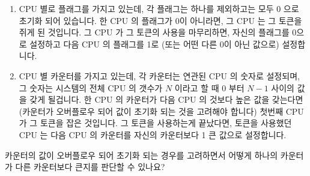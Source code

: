 \begin{enumerate}
\item	CPU 별로 플래그를 가지고 있는데, 각 플래그는 하나를 제외하고는 모두 0
	으로 초기화 되어 있습니다.
	한 CPU 의 플래그가 0이 아니라면, 그 CPU 는 그 토큰을 쥐게 된 것입니다.
	그 CPU 가 그 토큰의 사용을 마무리하면, 자신의 플래그를 0으로 설정하고
	다음 CPU 의 플래그를 1로 (또는 어떤 다른 0이 아닌 값으로) 설정합니다.
\item	CPU 별 카운터를 가지고 있는데, 각 카운터는 연관된 CPU 의 숫자로
	설정되며, 그 숫자는 시스템의 전체 CPU 의 갯수가 $N$ 이라고 할 때 0 부터
	$N-1$ 사이의 값을 갖게 될겁니다.
	한 CPU 의 카운터가 다음 CPU 의 것보다 높은 값을 갖는다면 (카운터가
	오버플로우 되어 값이 초기화 되는 것을 고려해야 합니다) 첫번째 CPU 가 그
	토큰을 잡은 것입니다.
	그 토큰을 사용하는게 끝났다면, 토큰을 사용했던 CPU 는 다음 CPU 의
	카운터를 자신의 카운터보다 1 큰 값으로 설정합니다.

\end{enumerate}

\QuickQuiz{}
	카운터의 값이 오버플로우 되어 초기화 되는 경우를 고려하면서 어떻게
	하나의 카운터가 다른 카운터보다 큰지를 판단할 수 있나요?
	\iffalse

